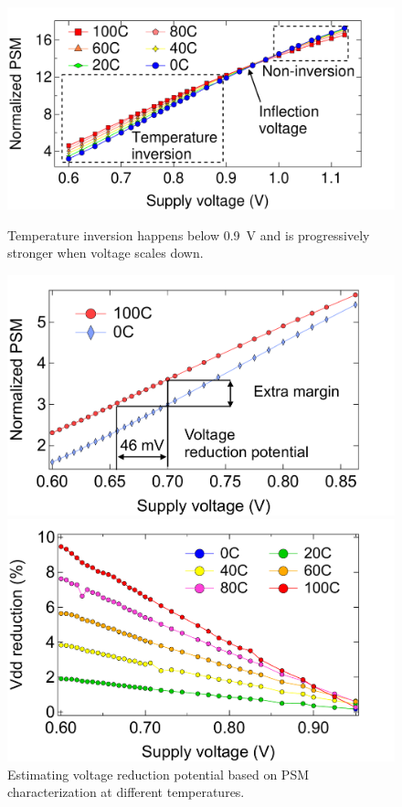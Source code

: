 \begin{figure}[t!]
  \centering
  \begin{minipage}{0.32\linewidth}
    \centering
      \includegraphics[trim=0 0 50 20,clip,width=.95\linewidth]{graphs/idle-psm-volt-temp.pdf}
      \caption{Temperature inversion happens below 0.9~V and is progressively stronger when voltage scales down.}
      \label{fig:psm-wide-range}
    \end{minipage}
\hfill
  \begin{minipage}{0.32\linewidth}
    \centering
         \includegraphics[trim=0 0 50 20,clip,width=.95\linewidth]{graphs/idle-psm-volt-nt.pdf}
       \caption{Estimating voltage reduction potential based on PSM characterization at different temperatures.}
       \label{fig:psm-nt}  
    \end{minipage}
\hfill
  \begin{minipage}{0.32\linewidth}
    \centering
      \includegraphics[trim=0 0 50 20,clip,width=.95\linewidth]{graphs/extrapolate-uv-potential.pdf}

\end{minipage}
\end{figure}
